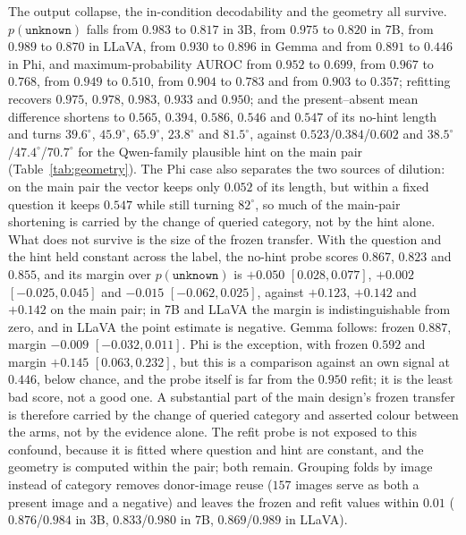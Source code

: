 \documentclass[10pt]{article}
\newcommand{\unknown}{\texttt{unknown}}
\newcommand{\punk}{p(\unknown)}
\begin{document}
The output collapse, the in-condition decodability and the geometry all survive. $\punk$ falls from $0.983$ to $0.817$ in 3B, from $0.975$ to $0.820$ in 7B, from $0.989$ to $0.870$ in LLaVA, from $0.930$ to $0.896$ in Gemma and from $0.891$ to $0.446$ in Phi, and maximum-probability AUROC from $0.952$ to $0.699$, from $0.967$ to $0.768$, from $0.949$ to $0.510$, from $0.904$ to $0.783$ and from $0.903$ to $0.357$; refitting recovers $0.975$, $0.978$, $0.983$, $0.933$ and $0.950$; and the present--absent mean difference shortens to $0.565$, $0.394$, $0.586$, $0.546$ and $0.547$ of its no-hint length and turns $39.6^\circ$, $45.9^\circ$, $65.9^\circ$, $23.8^\circ$ and $81.5^\circ$, against $0.523$/$0.384$/$0.602$ and $38.5^\circ$/$47.4^\circ$/$70.7^\circ$ for the Qwen-family plausible hint on the main pair (Table~\ref{tab:geometry}). The Phi case also separates the two sources of dilution: on the main pair the vector keeps only $0.052$ of its length, but within a fixed question it keeps $0.547$ while still turning $82^\circ$, so much of the main-pair shortening is carried by the change of queried category, not by the hint alone. What does not survive is the size of the frozen transfer. With the question and the hint held constant across the label, the no-hint probe scores $0.867$, $0.823$ and $0.855$, and its margin over $\punk$ is $+0.050$ $[0.028,0.077]$, $+0.002$ $[-0.025,0.045]$ and $-0.015$ $[-0.062,0.025]$, against $+0.123$, $+0.142$ and $+0.142$ on the main pair; in 7B and LLaVA the margin is indistinguishable from zero, and in LLaVA the point estimate is negative. Gemma follows: frozen $0.887$, margin $-0.009$ $[-0.032,0.011]$. Phi is the exception, with frozen $0.592$ and margin $+0.145$ $[0.063,0.232]$, but this is a comparison against an own signal at $0.446$, below chance, and the probe itself is far from the $0.950$ refit; it is the least bad score, not a good one. A substantial part of the main design's frozen transfer is therefore carried by the change of queried category and asserted colour between the arms, not by the evidence alone. The refit probe is not exposed to this confound, because it is fitted where question and hint are constant, and the geometry is computed within the pair; both remain. Grouping folds by image instead of category removes donor-image reuse ($157$ images serve as both a present image and a negative) and leaves the frozen and refit values within $0.01$ ($0.876$/$0.984$ in 3B, $0.833$/$0.980$ in 7B, $0.869$/$0.989$ in LLaVA).
\end{document}
